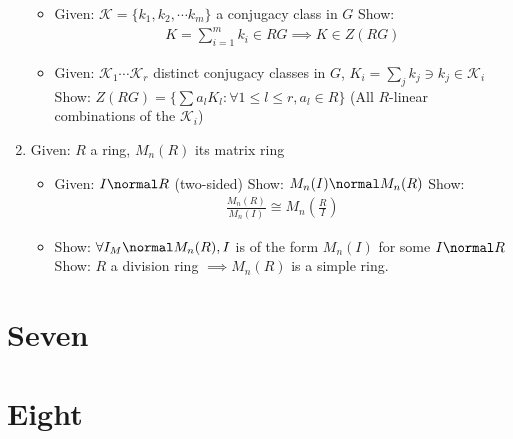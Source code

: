 \begin{enumerate}
  \begin{itemize}
  \tightlist
  \item
    Given: \(\mathcal{K} = \{ k_1, k_2, \cdots k_m\}\) a conjugacy class
    in \(G\) Show:
    \begin{align*}K = \sum_{i=1}^m k_i \in RG \implies K \in Z(RG)\end{align*}
  \item
    Given: \(\mathcal{K}_1\cdots \mathcal{K}_r\) distinct conjugacy
    classes in \(G\), \(K_i = \sum_{j}k_j \ni k_j \in \mathcal{K}_i\)
    Show:
    \(Z(RG) = \{\sum a_l K_l : \forall 1 \leq l \leq r, a_l \in R \}\)
    (All \(R\)-linear combinations of the \(\mathcal{K}_i\))
  \end{itemize}
\item
  Given: \(R\) a ring, \(M_n(R)\) its matrix ring

  \begin{itemize}
  \tightlist
  \item
    Given: \(I \normal R\) (two-sided) Show: \(M_n(I) \normal M_n(R)\)
    Show:
    \begin{align*}\frac{M_n(R)}{M_n(I)} \cong M_n(\frac{R}{I})\end{align*}
  \item
    Show: \(\forall I_M \normal M_n(R), I\) is of the form \(M_n(I)\)
    for some \(I \normal R\) Show: \(R\) a division ring
    \(\implies M_n(R)\) is a simple ring.
  \end{itemize}
\end{enumerate}

\hypertarget{seven}{%
\section{Seven}\label{seven}}

\hypertarget{eight}{%
\section{Eight}\label{eight}}





